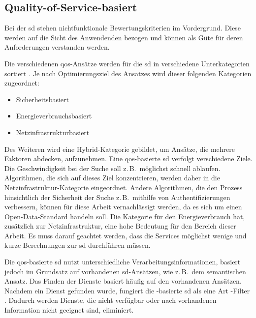 \subsection{Quality-of-Service-basiert}\label{subsec:qosbasedsd}

Bei der  \gls{sd} stehen nichtfunktionale Bewertungskriterien im Vordergrund. Diese werden auf die Sicht des Anwendenden bezogen und können als Güte für deren Anforderungen verstanden werden.

Die verschiedenen \gls{qos}-Ansätze werden für die \gls{sd} in verschiedene Unterkategorien sortiert \autocite{Achir.2020.AtosdaiI}. Je nach Optimierungsziel des Ansatzes wird dieser folgenden Kategorien zugeordnet:

\begin{itemize}
    \item Sicherheitsbasiert
    \item Energieverbrauchsbasiert
    \item Netzinfrastrukturbasiert
\end{itemize}

Des Weiteren wird eine Hybrid-Kategorie gebildet, um Ansätze, die mehrere Faktoren abdecken, aufzunehmen. Eine \gls{qos}-basierte \gls{sd} verfolgt verschiedene Ziele. Die Geschwindigkeit bei der Suche soll z.\,B.\ möglichst schnell ablaufen. Algorithmen, die sich auf dieses Ziel konzentrieren, werden daher in die Netzinfrastruktur-Kategorie eingeordnet. Andere Algorithmen, die den Prozess hinsichtlich der Sicherheit der Suche z.\,B.\ mithilfe von Authentifizierungen verbessern, können für diese Arbeit vernachlässigt werden, da es sich um einen Open-Data-Standard handeln soll. Die Kategorie für den Energieverbrauch hat, zusätzlich zur Netzinfrastruktur, eine hohe Bedeutung für den Bereich dieser Arbeit. Es muss darauf geachtet werden, dass die Services möglichst wenige und kurze Berechnungen zur \gls{sd} durchführen müssen.


Die \gls{qos}-basierte \gls{sd} nutzt unterschiedliche Verarbeitungsinformationen, basiert jedoch im Grundsatz auf vorhandenen \gls{sd}-Ansätzen, wie z.\,B.\ dem semantischen Ansatz. Das Finden der Dienste basiert häufig auf den vorhandenen Ansätzen. Nachdem ein Dienst gefunden wurde, fungiert die -basierte \gls{sd} als eine Art -Filter \autocite{Kosunalp.2020.SArlbQaIsdm}. Dadurch werden Dienste, die nicht verfügbar oder nach vorhandenen Information nicht geeignet sind, eliminiert.

